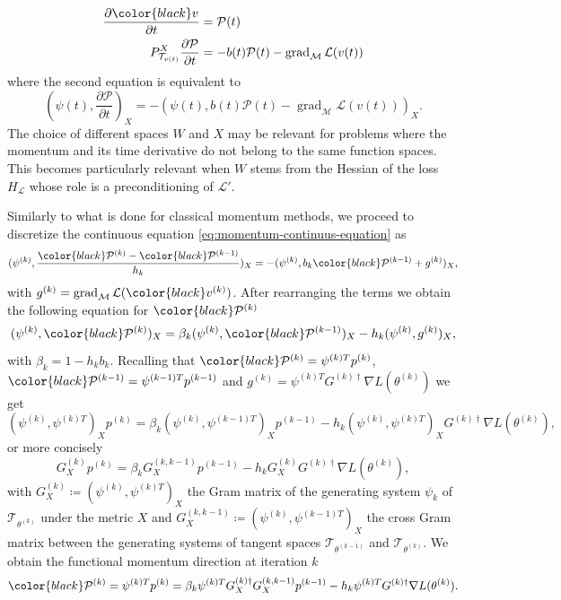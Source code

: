 \documentclass{article}
\theoremstyle{noparens}
\newcommand{\cL}{\mathcal{L}}
\newcommand{\cT}{\mathcal{T}}
\newcommand{\cM}{\mathcal{M}}
\newcommand{\cP}{\mathcal{P}}
\newcommand{\colorM}{\color{black}}
\newcommand{\colorT}{\color{black}}
\renewcommand{\v}{{\colorM v}}
\newcommand{\paramk}{\theta^{(k)}}
\newcommand{\paramkm}{\theta^{(k-1)}}
\newcommand{\vk}{{\colorM v^{(k)}}}
\newcommand{\dvdt}{\frac{\partial \v}{\partial t}}
\newcommand{\psik}{\psi^{(k)}}
\newcommand{\psikT}{\psi^{(k)T}}
\newcommand{\psikmT}{\psi^{(k-1)T}}
\newcommand{\pk}{p^{(k)}}
\newcommand{\pkm}{p^{(k-1)}}
\newcommand{\Pk}{{\colorT \cP^{(k)}}}
\newcommand{\Pkm}{{\colorT \cP^{(k-1)}}}
\newcommand{\dPdt}{\frac{\partial \cP}{\partial t}}
\newcommand{\gk}{g^{(k)}}
\newcommand{\Ginvk}{{G^{(k)\dagger}}}
\newcommand{\GXk}{{G^{(k)}_X}}
\newcommand{\GXinvk}{{G^{(k)\dagger}_X}}
\newcommand{\GXkkm}{{G^{(k,k-1)}_X}}
\newcommand{\cTk}{{\cT_{\paramk}}}
\newcommand{\cTkm}{{\cT_{\paramkm}}}
\newcommand{\GradP}{\nabla}
\newcommand{\LossGrad}{\GradP L}
\newcommand{\gradM}{\operatorname{grad}_{\cM}}
\begin{document}
\begin{subequations}
\begin{align}
    \dvdt &= \cP(t) \label{eq:functional-cP}\\
    P^X_{\cT_{v(t)}}\dPdt &= -b(t)\cP(t) - \gradM \cL(v(t)) \label{eq:momentum-continuus-equation}
\end{align}\label{eq:hb-continuus-equation}
\end{subequations}
where the second equation is equivalent to
$$
(\psi(t), \dPdt)_X = - (\psi(t) , b(t)\cP(t) - \gradM \cL(v(t)))_X.
$$
The choice of different spaces $W$ and $X$ may be relevant for  problems where the momentum and its time derivative do not belong to the same function spaces.
This becomes particularly relevant when $W$ stems from the Hessian of the loss $H_\cL$
whose role is a preconditioning of $\cL'$.

Similarly to what is done for classical momentum methods, we proceed to discretize the continuous equation \eqref{eq:momentum-continuus-equation} as
$$
(\psik, \frac{\Pk-\Pkm}{h_k})_X = -(\psik, b_k \Pkm + \gk)_X,
$$
with $\gk=\gradM\cL(\vk)$.
After rearranging the terms we obtain the following equation for $\Pk$
\begin{equation}
(\psik, \Pk)_X = \beta_k(\psik, \Pkm)_X - h_k (\psik, \gk)_X, \label{eq:momentum-tangent-space}
\end{equation}
with $\beta_k = 1-h_k b_k.$
Recalling that $\Pk=\psikT\pk$, $\Pkm=\psikmT\pkm$ and $\gk=\psikT\Ginvk\LossGrad(\paramk)$ we get
$$
(\psik, \psikT)_X\pk = \beta_k (\psik, \psikmT)_X\pkm - h_k (\psik, \psikT)_X \Ginvk \LossGrad(\paramk),
$$
or more concisely
\begin{equation}
\GXk\pk = \beta_k\GXkkm\pkm - h_k\GXk \Ginvk\LossGrad(\paramk), \label{eq:nhb-momentum-update}
\end{equation}
with $G_X^{(k)} \coloneqq ({\psik, \psikT})_X$ the Gram matrix of the generating system $\psi_k$ of $\cTk$ under the metric $X$ and $\GXkkm\coloneqq ({\psik, \psikmT})_X$ the cross Gram matrix between the generating systems of tangent spaces $\cTkm$ and  $\cTk$. We obtain  the functional momentum direction at iteration $k$
\begin{equation}
\Pk=\psikT\pk = \beta_k\psikT\GXinvk\GXkkm\pkm - h_k\psikT\Ginvk\LossGrad(\paramk).
\end{equation}
\end{document}
